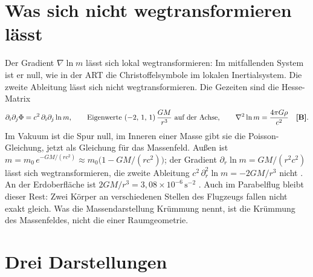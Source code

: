 \section{Was sich nicht wegtransformieren lässt}

Der Gradient $\nabla\ln m$ lässt sich lokal wegtransformieren: Im mitfallenden System ist er null,
wie in der ART die Christoffelsymbole im lokalen Inertialsystem. Die zweite Ableitung lässt sich
nicht wegtransformieren. Die Gezeiten sind die Hesse-Matrix
\begin{equation}
\partial_i\partial_j\Phi=c^2\,\partial_i\partial_j\ln m,\qquad
\text{Eigenwerte }(-2,\,1,\,1)\,\frac{GM}{r^3}\ \text{auf der Achse},\qquad
\nabla^2\ln m=\frac{4\pi G\rho}{c^2}\quad\textbf{[B]}.
\end{equation}
Im Vakuum ist die Spur null, im Inneren einer Masse gibt sie die Poisson-Gleichung, jetzt als
Gleichung für das Massenfeld. Außen ist $m=m_0\,e^{-GM/(rc^2)}\approx m_0\bigl(1-GM/(rc^2)\bigr)$;
der Gradient $\partial_r\ln m=GM/(r^2c^2)$ lässt sich wegtransformieren, die zweite Ableitung
$c^2\,\partial_r^2\ln m=-2GM/r^3$ nicht \BM. An der Erdoberfläche ist $2GM/r^3=3{,}08\times10^{-6}\,\text{s}^{-2}$
\KM. Auch im Parabelflug bleibt dieser Rest: Zwei Körper an verschiedenen Stellen des Flugzeugs
fallen nicht exakt gleich. Was die Massendarstellung \glqq Krümmung\grqq{} nennt, ist die Krümmung
des Massenfeldes, nicht die einer Raumgeometrie.

\section{Drei Darstellungen}


